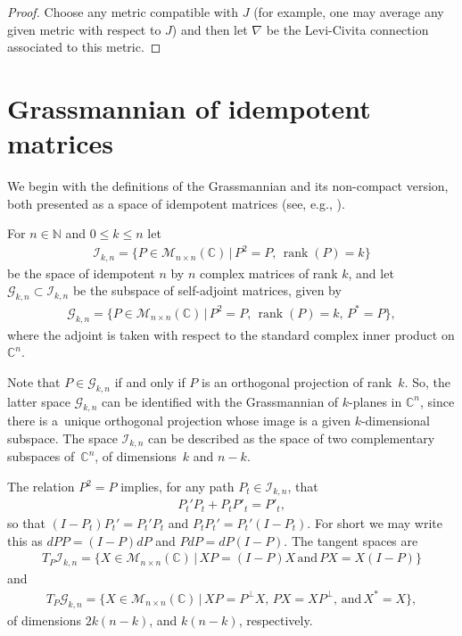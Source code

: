 \documentclass[pdftex]{sigma}
\numberwithin{equation}{section}
\newcommand{\N}{\mathbb{N}}
\newcommand{\CC}{\mathbb{C}}
\newcommand{\cG}{{\mathcal G}}
\newcommand{\cI}{{\mathcal I}}
\begin{document}
\begin{proof}Choose any metric compatible with $J$ (for example, one may average any given metric with respect to $J$) and then let $\nabla$ be the Levi-Civita connection associated to this metric.
\end{proof}

\section{Grassmannian of idempotent matrices} \label{sec;grass}

We begin with the definitions of the Grassmannian and its non-compact version, both presented as a space of idempotent matrices (see, e.g., \cite[Problem~5-C]{MS}).

\begin{defn}For $n \in \N$ and $0 \leq k \leq n$ let
\begin{gather*}
\cI_{k,n} = \big\{ P \in \mathcal{M}_{n \times n}(\CC) \,| \, P^2 = P, \, \operatorname{rank}(P) = k \big\}
\end{gather*}
be the space of idempotent $n$ by $n$ complex matrices of rank $k$, and let $ \cG_{k,n} \subset \cI_{k,n}$ be the subspace of self-adjoint matrices, given by
\begin{gather*}
\cG_{k,n} = \big\{ P \in \mathcal{M}_{n \times n}(\CC)\, | \, P^2 = P ,\, \operatorname{rank}(P) = k, \, P^* = P \big\},
\end{gather*}
where the adjoint is taken with respect to the standard complex inner product on $\CC^n$.
\end{defn}

Note that $P \in \cG_{k,n}$ if and only if $P$ is an orthogonal projection of rank~$k$. So, the latter space $\cG_{k,n}$ can be identified with the Grassmannian of $k$-planes in $\CC^n$, since there is a~unique orthogonal projection whose image is a given $k$-dimensional subspace. The space $\cI_{k,n}$ can be described as the space of two complementary subspaces of~$\CC^n$, of dimensions~$k$ and $n-k$.

The relation $P^2 = P$ implies, for any path $P_t \in \cI_{k,n}$, that
\begin{gather*}
P_t' P_t + P_t P'_t = P'_t,
\end{gather*}
so that $(I-P_t)P_t' = P_t'P_t$ and $P_t P_t' = P_t' (I-P_t)$. For short we may write this as $dPP= (I-P)dP$ and $P dP= dP (I-P)$. The tangent spaces are
\begin{gather*}
T_P\cI_{k,n} = \big\{ X \in \mathcal{M}_{n \times n}(\CC)\, |\, XP= (I-P)X \, \textrm{and} \, PX= X(I-P) \big\}
\end{gather*}
and
\begin{gather*}
T_P \cG_{k,n} = \big\{ X \in \mathcal{M}_{n \times n}(\CC) \,| \, XP = P^\perp X, \, PX= X P^\perp , \, \textrm{and} \, X^*=X \big\},
\end{gather*}
of dimensions $2k(n-k)$, and $k(n-k)$, respectively.
\end{document}

